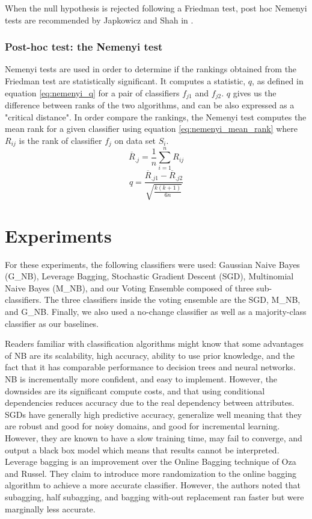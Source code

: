 When the null hypothesis is rejected following a Friedman test, post hoc Nemenyi tests are recommended by Japkowicz and Shah in \cite{japkowicz2011evaluating}.

\subsubsection{Post-hoc test: the Nemenyi test}
Nemenyi tests are used in order to determine if the rankings obtained from the Friedman test are statistically significant. It computes a statistic, $q$, as defined in equation \ref{eq:nemenyi_q} for a pair of classifiers $f_{j1}$ and $f_{j2}$. $q$ gives us the difference between ranks of the two algorithms, and can be also expressed as a "critical distance". In order compare the rankings, the Nemenyi test computes the mean rank for a given classifier using equation \ref{eq:nemenyi_mean_rank} where $R_{ij}$ is the rank of classifier $f_j$ on data set $S_i$.
\begin{equation}
\label{eq:nemenyi_q}
\overline{R}_{.j}=\frac{1}{n}\sum_{i=1}^nR_{ij}
\end{equation}\begin{equation}
\label{eq:nemenyi_mean_rank}
q=\frac{\overline{R}_{.j1}-\overline{R}_{.j2}}{\sqrt{\frac{k(k+1)}{6n}}}
\end{equation}

\section{Experiments}
For these experiments, the following classifiers were used: Gaussian Naive Bayes (G\_NB), Leverage Bagging, Stochastic Gradient Descent (SGD), Multinomial Naive Bayes (M\_NB), and our Voting Ensemble composed of three sub-classifiers. The three classifiers inside the voting ensemble are the SGD, M\_NB, and G\_NB. Finally, we also used a no-change classifier as well as a majority-class classifier as our baselines.

Readers familiar with classification algorithms might know that some advantages of NB are its scalability, high accuracy, ability to use prior knowledge, and the fact that it has comparable performance to decision trees and neural networks. NB is incrementally more confident, and easy to implement. However, the downsides are its significant compute costs, and that using conditional dependencies reduces accuracy due to the real dependency between attributes.
SGDs have generally high predictive accuracy, generalize well meaning that they are robust and good for noisy domains, and good for incremental learning. However, they are known to have a slow training time, may fail to converge, and output a black box model which means that results cannot be interpreted.
Leverage bagging \cite{bifet2010leveraging} is an improvement over the Online Bagging technique of Oza and Russel. They claim to introduce more randomization to the online bagging algorithm to achieve a more accurate classifier. However, the authors noted that subagging, half subagging, and bagging with-out replacement ran faster but were marginally less accurate.

